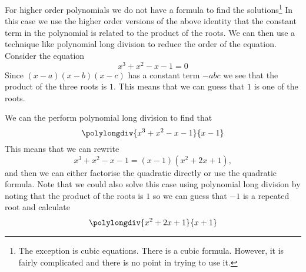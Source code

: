 For higher order polynomials we do not have a formula to find the solutions\footnote{The exception is cubic equations. There is a cubic formula. However, it is fairly complicated and there is no point in trying to use it.} In this case we use the higher order versions of the above identity that the constant term in the polynomial is related to the product of the roots. We can then use a technique like polynomial long division to reduce the order of the equation.\\

Consider the equation
\begin{equation*}
x^{3}+x^{2}-x-1=0
\end{equation*}
Since $(x-a)(x-b)(x-c)$ has a constant term $-abc$ we see that the product of the three roots is $1$. This means that we can guess that $1$ is one of the roots. 

\begin{warpprint}
We can the perform polynomial long division to find that
\begin{equation*}
\polylongdiv{x^3+x^2-x-1}{x-1}
\end{equation*}
This means that we can rewrite
\begin{equation*}
x^{3}+x^{2}-x-1=(x-1)(x^{2}+2x+1),
\end{equation*}
and then we can either factorise the quadratic directly or use the quadratic formula. Note that we could also solve this case using polynomial long division by noting that the product of the roots is $1$ so we can guess that $-1$ is a repeated root and calculate
\begin{equation*}
\polylongdiv{x^{2}+2x+1}{x+1}
\end{equation*}
\end{warpprint}

